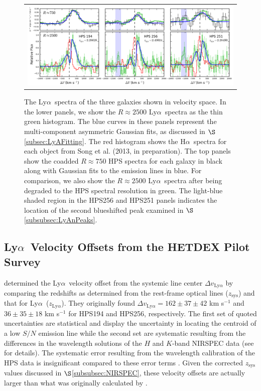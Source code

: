 \documentclass{emulateapj}
\newcommand{\lya}{Ly$\alpha$}
\newcommand{\ha}{H$\alpha$}
\begin{document}
	\begin{figure}[t]
	\begin{center}
	\begin{tabular}{c}
	\includegraphics[width=18cm]{f3.png}
	\end{tabular}
	\end{center}
	\caption[example] 
	{ \label{fig:VSpec} 
	The \lya\ spectra of the three galaxies shown in velocity space. In the lower panels, we show the $R\approx2500$ \lya\ spectra as the thin green histogram. The blue curves in these panels represent the multi-component asymmetric Gaussian fits, as discussed in $\S$\ref{subsec:LyAFitting}. The red histogram shows the \ha\ spectra for each object from Song et al. (2013, in preparation). The top panels show the coadded $R\approx750$ HPS spectra for each galaxy in black along with Gaussian fits to the emission lines in blue. For comparison, we also show the $R\approx2500$ \lya\ spectra after being degraded to the HPS spectral resolution in green. The light-blue shaded region in the HPS256 and HPS251 panels indicates the location of the second blueshifted peak examined in $\S$\ref{subsubsec:LyAnPeaks}.}
	\end{figure} 

\subsection{\lya\ Velocity Offsets from the HETDEX Pilot Survey}\label{subsec:HPSoffset}
\citet{finkelstein2011} determined the \lya\ velocity offset from the systemic line center $\Delta v_{\mathrm{Ly}\alpha}$ by comparing the redshifts as determined from the rest-frame optical lines ($z_{\mathrm{sys}}$) and that for \lya\ ($z_{\mathrm{Ly}\alpha}$). They originally found $\Delta v_{\mathrm{Ly}\alpha} = 162 \pm 37 \pm 42$ km s$^{-1}$ and $36 \pm 35 \pm 18$ km s$^{-1}$ for HPS194 and HPS256, respectively. The first set of quoted uncertainties are statistical and display the uncertainty in locating the centroid of a low $S/N$ emission line while the second set are systematic resulting from the differences in the wavelength solutions of the $H$ and $K$-band NIRSPEC data (see \citealp{finkelstein2011} for details). The systematic error resulting from the wavelength calibration of the HPS data is insignificant compared to these error terms \citep{adams2011}. Given the corrected $z_{\mathrm{sys}}$ values discussed in $\S$\ref{subsubsec:NIRSPEC}, these velocity offsets are actually larger than what was originally calculated by \citet{finkelstein2011}. 
\end{document}
